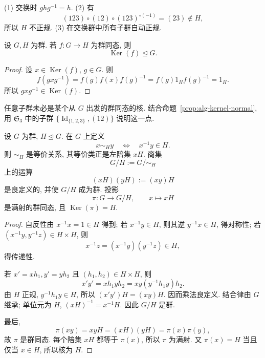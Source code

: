 \documentclass[usesamecnt, thmcnt=section, lang=cn, newtx, 10pt, scheme=chinese]{elegantbook}
\begin{document}
\begin{solution}
(1) 交换时 $ghg^{-1}=h$. (2) 有
\[
 (123)\circ(12)\circ(123)^{\circ(-1)}=(23)\notin H,
\]
所以 $H$ 不正规. (3) 在交换群中所有子群自动正规.
\end{solution}

\begin{proposition}\label{prop:alg-kernel-normal}
设 $G,H$ 为群. 若 $f:G\to H$ 为群同态, 则
\[
 \operatorname{Ker}(f)\trianglelefteq G.
\]
\end{proposition}

\begin{proof}
设 $x\in\operatorname{Ker}(f)$, $g\in G$. 则
\[
 f(gxg^{-1})=f(g)f(x)f(g)^{-1}=f(g)1_Hf(g)^{-1}=1_H.
\]
所以 $gxg^{-1}\in\operatorname{Ker}(f)$.
\end{proof}

\begin{exercise}\label{ex:alg-normal-not-kernel}
任意子群未必是某个从 $G$ 出发的群同态的核. 结合命题~\ref{prop:alg-kernel-normal}, 用 $\mathfrak S_3$ 中的子群 $\{\operatorname{Id}_{\{1,2,3\}},(12)\}$ 说明这一点.
\end{exercise}

\begin{theorem}\label{thm:alg-quotient-group}
设 $G$ 为群, $H\trianglelefteq G$. 在 $G$ 上定义
\[
 x\sim_H y
 \quad\Longleftrightarrow\quad
 x^{-1}y\in H.
\]
则 $\sim_H$ 是等价关系, 其等价类正是左陪集 $xH$. 商集
\[
 G/H:=G/{\sim_H}
\]
上的运算
\[
 (xH)(yH):=(xy)H
\]
是良定义的, 并使 $G/H$ 成为群. 投影
\[
 \pi:G\longrightarrow G/H,
 \qquad x\longmapsto xH
\]
是满射的群同态, 且 $\operatorname{Ker}(\pi)=H$.
\end{theorem}

\begin{proof}
自反性由 $x^{-1}x=1\in H$ 得到; 若 $x^{-1}y\in H$, 则其逆 $y^{-1}x\in H$, 得对称性; 若 $(x^{-1}y,y^{-1}z)\in H\times H$, 则
\[
 x^{-1}z=(x^{-1}y)(y^{-1}z)\in H,
\]
得传递性.

若 $x'=xh_1,y'=yh_2$ 且 $(h_1,h_2)\in H\times H$, 则
\[
 x'y'=xh_1yh_2=xy(y^{-1}h_1y)h_2.
\]
由 $H$ 正规, $y^{-1}h_1y\in H$, 所以 $(x'y')H=(xy)H$. 因而乘法良定义. 结合律由 $G$ 继承; 单位元为 $H$, $(xH)^{-1}=x^{-1}H$. 因此 $G/H$ 是群.

最后,
\[
 \pi(xy)=xyH=(xH)(yH)=\pi(x)\pi(y),
\]
故 $\pi$ 是群同态. 每个陪集 $xH$ 都等于 $\pi(x)$, 所以 $\pi$ 为满射. 又 $\pi(x)=H$ 当且仅当 $x\in H$, 所以核为 $H$.
\end{proof}
\end{document}
